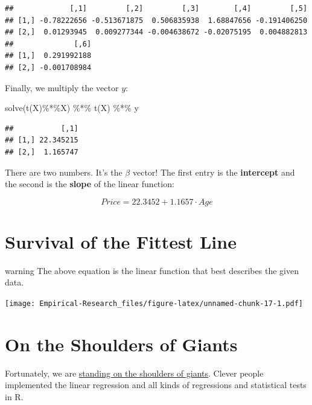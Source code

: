 \documentclass[
]{book}
\newenvironment{Shaded}{\begin{snugshade}}{\end{snugshade}}
\newcommand{\FunctionTok}[1]{\textcolor[rgb]{0.00,0.00,0.00}{#1}}
\newcommand{\NormalTok}[1]{#1}
\newcommand{\SpecialCharTok}[1]{\textcolor[rgb]{0.00,0.00,0.00}{#1}}
\begin{document}
\begin{verbatim}
##             [,1]         [,2]         [,3]        [,4]         [,5]
## [1,] -0.78222656 -0.513671875  0.506835938  1.68847656 -0.191406250
## [2,]  0.01293945  0.009277344 -0.004638672 -0.02075195  0.004882813
##              [,6]
## [1,]  0.291992188
## [2,] -0.001708984
\end{verbatim}

Finally, we multiply the vector \(y\):

\begin{Shaded}
\begin{Highlighting}[]
\FunctionTok{solve}\NormalTok{(}\FunctionTok{t}\NormalTok{(X)}\SpecialCharTok{\%*\%}\NormalTok{X) }\SpecialCharTok{\%*\%} \FunctionTok{t}\NormalTok{(X) }\SpecialCharTok{\%*\%}\NormalTok{ y}
\end{Highlighting}
\end{Shaded}

\begin{verbatim}
##           [,1]
## [1,] 22.345215
## [2,]  1.165747
\end{verbatim}

There are two numbers. It's the \(\beta\) vector! The first entry is the \textbf{intercept} and the second is the \textbf{slope} of the linear function:

\[Price = 22.3452 + 1.1657 \cdot Age\]

\hypertarget{survival-of-the-fittest-line}{%
\section{Survival of the Fittest Line}\label{survival-of-the-fittest-line}}

\begin{infobox}warning
The above equation is the linear function that best describes the given data.

\end{infobox}

\texttt{[image: Empirical-Research\_files/figure-latex/unnamed-chunk-17-1.pdf]}

\hypertarget{on-the-shoulders-of-giants}{%
\section{On the Shoulders of Giants}\label{on-the-shoulders-of-giants}}

Fortunately, we are \href{https://en.wikipedia.org/wiki/Standing_on_the_shoulders_of_giants}{standing on the shoulders of giants}. Clever people implemented the linear regression and all kinds of regressions and statistical tests in R.
\end{document}
